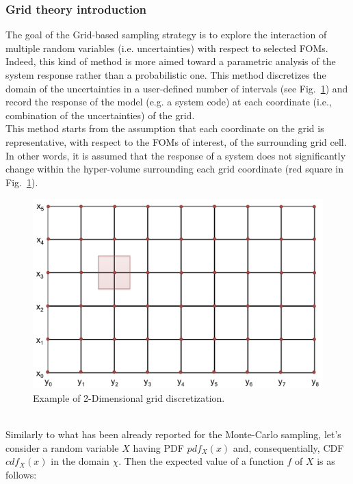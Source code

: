 \subsubsection{Grid theory introduction}
\label{subsub:Gridtheory}
The goal of the Grid-based sampling strategy is to explore the interaction of multiple random 
variables (i.e. uncertainties) with respect to selected FOMs. Indeed, this kind of method is more aimed toward a 
parametric analysis of the system response rather than a probabilistic one. This method discretizes the
domain of the uncertainties in a user-defined number of intervals (see Fig.~\ref{fig:GridDiscretization}) and 
record the response of the model (e.g. a system code) at each coordinate (i.e., combination of the uncertainties) of the grid.
\\ This method starts from the assumption that each coordinate on the grid is representative, with respect to the FOMs of interest, of the surrounding grid cell. In other words, it is assumed that the response of a system does not significantly change within the hyper-volume surrounding each grid coordinate (red square in Fig.~\ref{fig:GridDiscretization}).
 \begin{figure}[h!]
  \centering
  \includegraphics[scale=0.7]{pics/GridDiscretization.png}
  \caption{Example of 2-Dimensional grid discretization. }
  \label{fig:GridDiscretization}
 \end{figure}
\\Similarly to what has been already reported for the Monte-Carlo sampling, let's consider a random variable $X$ having PDF $pdf_{X}(x)$ and, consequentially, CDF $cdf_{X}(x)$ in the domain $\chi$. Then the expected value of a function $f$ of $X$ is as follows:
